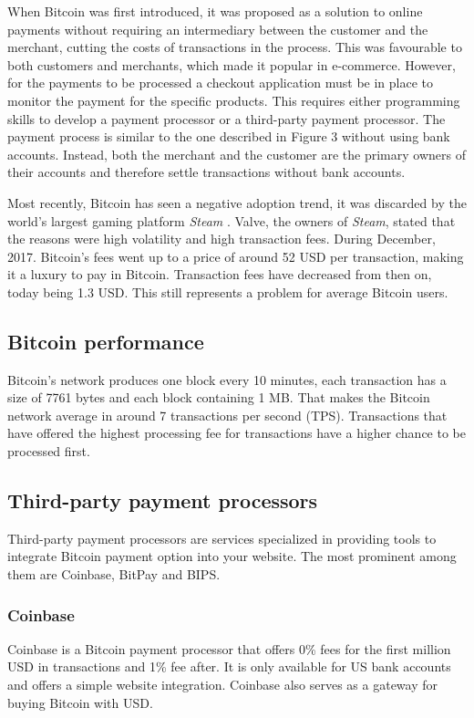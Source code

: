 \documentclass{ferseminar}
\begin{document}
When Bitcoin was first introduced, it was proposed as a solution to online payments without requiring an intermediary between the customer and the merchant, cutting the costs of transactions in the process. This was favourable to both customers and merchants, which made it popular in e-commerce. However, for the payments to be processed a checkout application must be in place to monitor the payment for the specific products. This requires either programming skills to develop a payment processor or a third-party payment processor. The payment process is similar to the one described in Figure 3 without using bank accounts. Instead, both the merchant and the customer are the primary owners of their accounts and therefore settle transactions without bank accounts.

Most recently, Bitcoin has seen a negative adoption trend, it was discarded by the world's largest gaming platform \textit{Steam} \cite{Steam}. Valve, the owners of \textit{Steam}, stated that the reasons were high volatility and high transaction fees. During December, 2017. Bitcoin's fees went up to a price of around 52 USD per transaction, making it a luxury to pay in Bitcoin. Transaction fees have decreased from then on, today being 1.3 USD. This still represents a problem for average Bitcoin users.


\subsection{Bitcoin performance}
Bitcoin's network produces one block every 10 minutes, each transaction has a size of 7761 bytes and each block containing 1 MB. That makes the Bitcoin network average in around 7 transactions per second (TPS). Transactions that have offered the highest processing fee for transactions have a higher chance to be processed first.


\subsection{Third-party payment processors}
Third-party payment processors are services specialized in providing tools to integrate Bitcoin payment option into your website. The most prominent among them are Coinbase, BitPay and BIPS. 

\subsubsection{Coinbase}
Coinbase is a Bitcoin payment processor that offers 0\% fees for the first million USD in transactions and 1\% fee after. It is only available for US bank accounts and offers a simple website integration. Coinbase also serves as a gateway for buying Bitcoin with USD.
\end{document}

